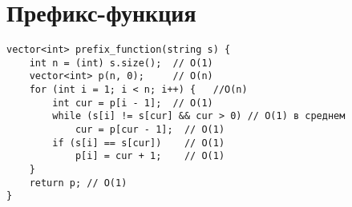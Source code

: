 \documentclass[otchet]{SCWorks}
\begin{document}

\date{2025}

\maketitle

\secNumbering

\tableofcontents






\section{Префикс-функция}

\begin{verbatim}
vector<int> prefix_function(string s) {
    int n = (int) s.size();  // O(1)
    vector<int> p(n, 0);     // О(n)
    for (int i = 1; i < n; i++) {   //O(n)
        int cur = p[i - 1];  // O(1)
        while (s[i] != s[cur] && cur > 0) // О(1) в среднем
            cur = p[cur - 1];  // О(1)
        if (s[i] == s[cur])    // О(1)
            p[i] = cur + 1;    // О(1)
    }
    return p; // О(1)
}
\end{verbatim}
\end{document}
